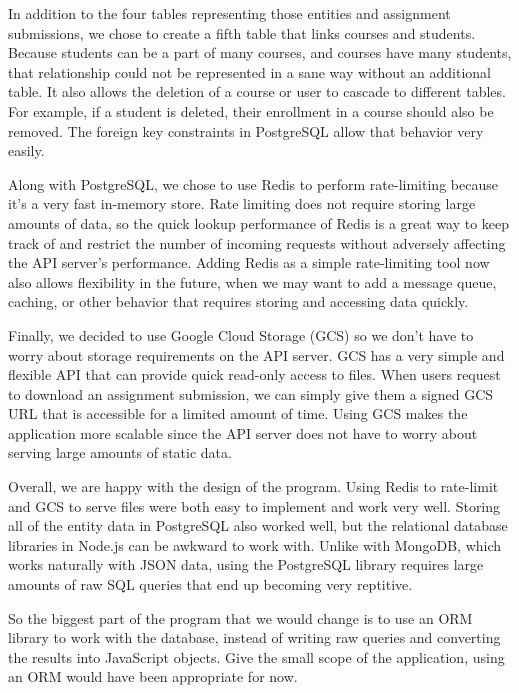 \documentclass[11pt]{article}
\begin{document}
In addition to the four tables representing those entities and assignment submissions, we chose to create a fifth table that links courses and students. Because students can be a part of many courses, and courses have many students, that relationship could not be represented in a sane way without an additional table. It also allows the deletion of a course or user to cascade to different tables. For example, if a student is deleted, their enrollment in a course should also be removed. The foreign key constraints in PostgreSQL allow that behavior very easily.

Along with PostgreSQL, we chose to use Redis to perform rate-limiting because it's a very fast in-memory store. Rate limiting does not require storing large amounts of data, so the quick lookup performance of Redis is a great way to keep track of and restrict the number of incoming requests without adversely affecting the API server's performance. Adding Redis as a simple rate-limiting tool now also allows flexibility in the future, when we may want to add a message queue, caching, or other behavior that requires storing and accessing data quickly.

Finally, we decided to use Google Cloud Storage (GCS) so we don't have to worry about storage requirements on the API server. GCS has a very simple and flexible API that can provide quick read-only access to files. When users request to download an assignment submission, we can simply give them a signed GCS URL that is accessible for a limited amount of time. Using GCS makes the application more scalable since the API server does not have to worry about serving large amounts of static data.

Overall, we are happy with the design of the program. Using Redis to rate-limit and GCS to serve files were both easy to implement and work very well. Storing all of the entity data in PostgreSQL also worked well, but the relational database libraries in Node.js can be awkward to work with. Unlike with MongoDB, which works naturally with JSON data, using the PostgreSQL library requires large amounts of raw SQL queries that end up becoming very reptitive.

So the biggest part of the program that we would change is to use an ORM library to work with the database, instead of writing raw queries and converting the results into JavaScript objects. Give the small scope of the application, using an ORM would have been appropriate for now.
\end{document}
